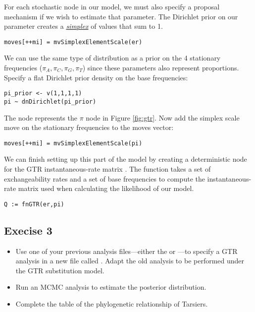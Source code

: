 For each stochastic node in our model, we must also specify a proposal mechanism if we wish to estimate that parameter. 
The Dirichlet prior on our parameter  creates a \href{http://en.wikipedia.org/wiki/Simplex}{\textit{simplex}} of values that sum to 1. 

{\tt\small \begin{snugshade*}
\begin{lstlisting}
moves[++mi] = mvSimplexElementScale(er) 
\end{lstlisting}
\end{snugshade*}}

We can use the same type of distribution as a prior on the 4 stationary frequencies ($\pi_A, \pi_C, \pi_G, \pi_T$) since these parameters also represent proportions. 
Specify a flat Dirichlet prior density on the base frequencies:
{\tt \begin{snugshade*}
\begin{lstlisting}
pi_prior <- v(1,1,1,1) 
pi ~ dnDirichlet(pi_prior)
\end{lstlisting}
\end{snugshade*}}

The node  represents the $\pi$ node in Figure \ref{fig:gtr}.
Now add the simplex scale move on the stationary frequencies to the moves vector:
{\tt \small \begin{snugshade*}
\begin{lstlisting}
moves[++mi] = mvSimplexElementScale(pi)  
\end{lstlisting}
\end{snugshade*}}

We can finish setting up this part of the model by creating a deterministic node for the GTR instantaneous-rate matrix . 
The  function takes a set of exchangeability rates and a set of base frequencies to compute the instantaneous-rate matrix used when calculating the likelihood of our model.
{\tt \begin{snugshade*}
\begin{lstlisting}
Q := fnGTR(er,pi)
\end{lstlisting}
\end{snugshade*}}




\subsection{Execise 3}

\begin{itemize}
\item Use one of your previous analysis files---either the  or ---to specify a GTR analysis in a new file called .
	Adapt the old analysis to be performed under the GTR substitution model. 
\item Run an MCMC analysis to estimate the posterior distribution.
\item Complete the table of the phylogenetic relationship of Tarsiers.
\end{itemize}






